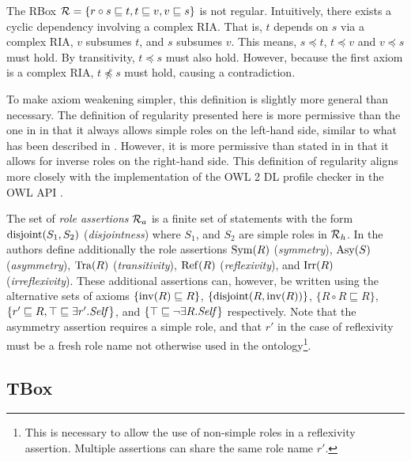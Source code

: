 \begin{example}
  The RBox $\mathcal{R} = \{ r \circ s \sqsubseteq t, t \sqsubseteq v, v \sqsubseteq s \}$ is not regular. Intuitively, there exists a cyclic dependency involving a complex RIA. That is, $t$ depends on $s$ via a complex RIA, $v$ subsumes $t$, and $s$ subsumes $v$. This means, $s \preceq t$, $t \preceq v$ and $v \preceq s$ must hold. By transitivity, $t \preceq s$ must also hold. However, because the first axiom is a complex RIA, $t \not\preceq s$ must hold, causing a contradiction.
\end{example}

To make axiom weakening simpler, this definition is slightly more general than necessary. The definition of regularity presented here is more permissive than the one in \cite{horrocks2006even} in that it always allows simple roles on the left-hand side, similar to what has been described in \cite{rudolph2011foundations}. However, it is more permissive than stated in \cite{rudolph2011foundations} in that it allows for inverse roles on the right-hand side. This definition of regularity aligns more closely with the implementation of the OWL 2 DL \cite{motik2012ontology} profile checker in the OWL API \cite{horridge2011owl,owlapi}.

The set of \emph{role assertions} $\mathcal{R}_a$ is a finite set of statements with the form $\operatorname{disjoint}(S_1, S_2)$ (\emph{disjointness}) where $S_1$, and $S_2$ are simple roles in $\mathcal{R}_h$. In \cite{horrocks2006even} the authors define additionally the role assertions $\operatorname{Sym}(R)$ (\emph{symmetry}), $\operatorname{Asy}(S)$ (\emph{asymmetry}), $\operatorname{Tra}(R)$ (\emph{transitivity}), $\operatorname{Ref}(R)$ (\emph{reflexivity}), and $\operatorname{Irr}(R)$ (\emph{irreflexivity}). These additional assertions can, however, be written using the alternative sets of axioms $\{ \operatorname{inv}(R) \sqsubseteq R \}$, $\{ \operatorname{disjoint}(R, \operatorname{inv}(R)) \}$, $\{ R \circ R \sqsubseteq R \}$, $\{ r' \sqsubseteq R , \top \sqsubseteq \exists r'.\mathit{Self} \}$, and $\{ \top \sqsubseteq \lnot \exists R.\mathit{Self} \}$ respectively. Note that the asymmetry assertion requires a simple role, and that $r'$ in the case of reflexivity must be a fresh role name not otherwise used in the ontology\footnote{This is necessary to allow the use of non-simple roles in a reflexivity assertion. Multiple assertions can share the same role name $r'$.}.

\subsection{TBox} \label{tbox}

